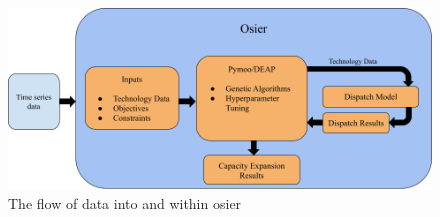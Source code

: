 \begin{graphicalabstract}
\begin{figure}[htbp!]
    \begin{center}
        \includegraphics[width=\textwidth]{./images/osier_flow.png}
    \end{center}
    \caption{The flow of data into and within \Gls{osier} \cite{dotson_osier_2024}}
    \label{fig:osier_flow}
\end{figure}
\end{graphicalabstract}
